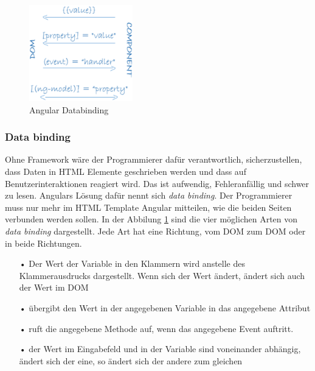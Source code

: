 \mbox{}
\begin{figure}
\vspace{-50pt}
  \begin{center}
    \includegraphics[width=0.4\textwidth]{Bilder/Greistorfer/databinding}
  \end{center}
  \caption[Angular Databinding]{Angular Databinding\protect\footnotemark}
  \label{Angular Databinding}
  \vspace{0pt}
\end{figure}
\vspace{-40pt}


\subsubsection{Data binding}
\label{sec:ang-data-binding}
Ohne Framework wäre der Programmierer dafür verantwortlich, sicherzustellen, dass Daten in \ac{HTML} Elemente geschrieben werden und dass auf Benutzerinteraktionen reagiert wird. Das ist aufwendig, Fehleranfällig und schwer zu lesen. Angulars Lösung dafür nennt sich \textit{data binding}. Der Programmierer muss nur mehr im \ac{HTML} Template Angular mitteilen, wie die beiden Seiten verbunden werden sollen. In der Abbilung \ref{Angular Databinding} sind die vier möglichen Arten von \textit{data binding} dargestellt. Jede Art hat eine Richtung, vom \ac{DOM} zum \ac{DOM} oder in beide Richtungen.

\begin{itemize}
\item[•]  Der Wert der Variable in den Klammern wird anstelle des Klammerausdrucks dargestellt. Wenn sich der Wert ändert, ändert sich auch der Wert im \ac{DOM}
\item[•]  übergibt den Wert in der angegebenen Variable in das angegebene Attribut
\item[•]  ruft die angegebene Methode auf, wenn das angegebene Event auftritt.
\item[•]  der Wert im Eingabefeld und in der Variable sind voneinander abhängig, ändert sich der eine, so ändert sich der andere zum gleichen
\end{itemize}

